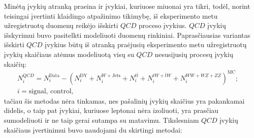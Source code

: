 \documentclass[a4paper, 12pt, oneside]{article}
\newcommand{\tbarW}{\bar{t}W}
\newcommand{\ttbar}{t\bar{t}}
\newcommand{\QCD}{QC\! D}
\begin{document}
Minėtą įvykių atranką praeina ir įvykiai, kuriuose miuonai yra tikri, todėl, norint teisingai įvertinti klaidingo atpažinimo
tikimybę, iš eksperimento metu užregistruotų duomenų reikėjo išskirti $\QCD$ proceso įvykius.
$\QCD$ įvykių išskyrimui buvo pasitelkti modeliuoti duomenų rinkiniai.
Paprasčiausias variantas išskirti $\QCD$ įvykius būtų iš atranką praėjusių eksperimento metu užregistruotų įvykių skaičiaus
atėmus modeliuotą visų su $\QCD$ nesusijusių procesų įvykių skaičių:
\begin{multline}
	N^{\QCD}_{i} = N^{\mathrm{Data}}_{i} - \left( N^{\mathrm{DY}}_{i} +
	N^{W+\mathrm{Jets}}_{i} + N^{\ttbar}_{i} + N^{tW+\tbarW}_{i} +
	N^{WW+WZ+ZZ}_{i} \right)^{\mathrm{MC}}; \\ i = \mathrm{signal}, \, \mathrm{control},
\end{multline}
tačiau šis metodas nėra tinkamas, nes pašalinių įvykių skaičius yra pakankamai didelis, o taip pat įvykiai, kuriuose leptonai
nėra izoliuoti, yra prasčiau sumodeliuoti ir ne taip gerai sutampa su matavimu.
Tikslesniam $\QCD$ įvykių skaičiaus įvertinimui buvo naudojami du skirtingi metodai:
\end{document}
